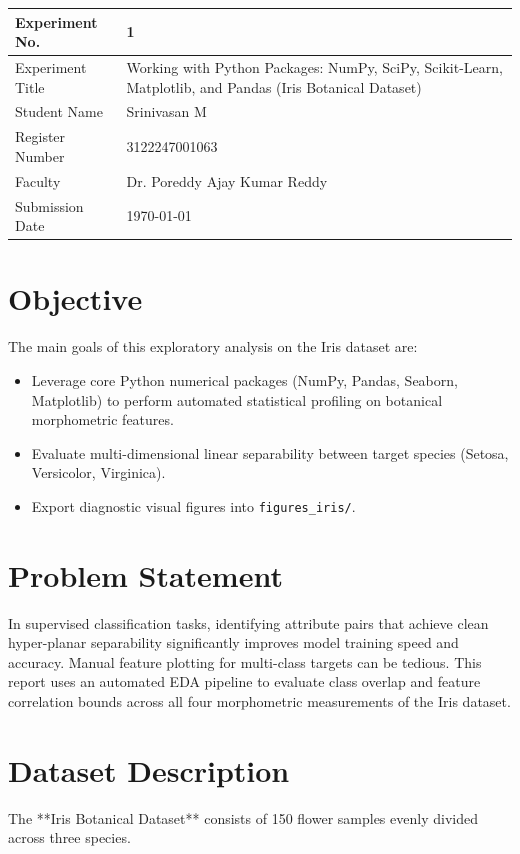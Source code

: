 \documentclass[12pt,a4paper]{article}
\begin{document}
\begin{tabular}{|p{4cm}|p{11cm}|}
\hline
Experiment No. & 1 \\ \hline
Experiment Title & Working with Python Packages: NumPy, SciPy, Scikit-Learn, Matplotlib, and Pandas (Iris Botanical Dataset) \\ \hline
Student Name & Srinivasan M \\ \hline
Register Number & 3122247001063 \\ \hline
Faculty & Dr. Poreddy Ajay Kumar Reddy \\ \hline
Submission Date & \today \\ \hline
\end{tabular}

\vspace{0.3cm}

\section{Objective}
The main goals of this exploratory analysis on the Iris dataset are:
\begin{itemize}[noitemsep]
    \item Leverage core Python numerical packages (NumPy, Pandas, Seaborn, Matplotlib) to perform automated statistical profiling on botanical morphometric features.
    \item Evaluate multi-dimensional linear separability between target species (Setosa, Versicolor, Virginica).
    \item Export diagnostic visual figures into \texttt{figures\_iris/}.
\end{itemize}

\section{Problem Statement}
In supervised classification tasks, identifying attribute pairs that achieve clean hyper-planar separability significantly improves model training speed and accuracy. Manual feature plotting for multi-class targets can be tedious. This report uses an automated EDA pipeline to evaluate class overlap and feature correlation bounds across all four morphometric measurements of the Iris dataset.

\section{Dataset Description}
The **Iris Botanical Dataset** consists of 150 flower samples evenly divided across three species.
\end{document}
